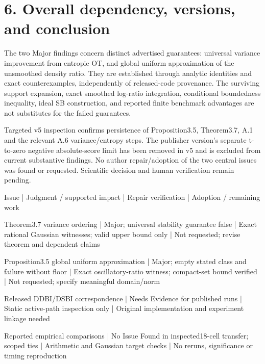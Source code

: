 \documentclass[10pt]{article}
\begin{document}
\section*{6. Overall dependency, versions, and conclusion}
The two Major findings concern distinct advertised guarantees: universal variance improvement from entropic OT, and global uniform approximation of the unsmoothed density ratio. They are established through analytic identities and exact counterexamples, independently of released-code provenance. The surviving support expansion, exact smoothed log-ratio integration, conditional boundedness inequality, ideal SB construction, and reported finite benchmark advantages are not substitutes for the failed guarantees.\par
Targeted v5 inspection confirms persistence of Proposition3.5, Theorem3.7, A.1 and the relevant A.6 variance/entropy steps. The publisher version’s separate t-to-zero negative absolute-score limit has been removed in v5 and is excluded from current substantive findings. No author repair/adoption of the two central issues was found or requested. Scientific decision and human verification remain pending.\par
Issue | Judgment / supported impact | Repair verification | Adoption / remaining work\par
Theorem3.7 variance ordering | Major; universal stability guarantee false | Exact rational Gaussian witnesses; valid upper bound only | Not requested; revise theorem and dependent claims\par
Proposition3.5 global uniform approximation | Major; empty stated class and failure without floor | Exact oscillatory-ratio witness; compact-set bound verified | Not requested; specify meaningful domain/norm\par
Released DDBI/DSBI correspondence | Needs Evidence for published runs | Static active-path inspection only | Original implementation and experiment linkage needed\par
Reported empirical comparisons | No Issue Found in inspected18-cell transfer; scoped ties | Arithmetic and Gaussian target checks | No reruns, significance or timing reproduction\par
\end{document}
